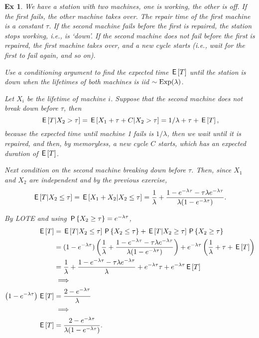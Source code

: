 \documentclass[a4paper,11pt]{article}
\newtheorem{exercise}[theorem]{Ex}
\begin{document}
\begin{exercise}
We have a station with two machines, one is working, the other is off.
If the first fails, the other machine takes over.
The repair time of the first machine is a constant $\tau$.
If the second machine fails before the first is repaired, the station stops working, i.e., is `down'. If the second machine does not fail before the first is repaired, the first machine takes over, and a new cycle starts (i.e., wait for the first to fail again, and so on).

Use a conditioning argument to find the expected time $\E T$ until the station is down when the lifetimes of both machines is iid $\sim\Exp{\lambda}$.
\begin{solution}
Let $X_i$ be the lifetime of machine $i$. Suppose that  the second machine does not break down before $\tau$, then
\begin{equation}
\E{T| X_{2}>\tau} = \E{X_{1} + \tau + C |X_2>\tau} = 1/\lambda + \tau + \E T,
\end{equation}
because the expected time until machine 1 fails is $1/\lambda$, then we wait until it is repaired, and then, by memoryless, a new cycle $C$ starts, which has an expected duration of $\E T$.

Next condition on the second machine breaking down before $\tau$. Then, since $X_{1}$ and $X_2$ are independent and by the previous exercise,
\begin{equation}
\E{T| X_{2}\leq \tau} = \E{X_{1} + X_{2}  |X_2\leq \tau} = \frac{1}{\lambda} + \frac{ 1- e^{-\lambda \tau}- \tau \lambda  e^{-\lambda \tau}}{\lambda(1-e^{-\lambda \tau})}.
\end{equation}

By LOTE and using $\P{X_{2}\geq \tau} = e^{-\lambda \tau}$,
\begin{align}
  \label{eq:924}
\E T
&=
\E{T| X_{2}\leq \tau} \P{X_{2}\leq \tau} + \E{T| X_{2}\geq \tau} \P{X_{2}\geq \tau} \\
&=(1-e^{-\lambda \tau})\left( \frac 1\lambda+
\frac{ 1- e^{-\lambda \tau}- \tau \lambda  e^{-\lambda \tau}}{\lambda(1-e^{-\lambda \tau})} \right)
+e^{-\lambda \tau}\left( \frac{1}{\lambda} + \tau + \E T \right) \\
&=\frac{1}{\lambda} + \frac{ 1- e^{-\lambda \tau}- \tau \lambda  e^{-\lambda \tau}}{\lambda}
+e^{-\lambda \tau} \tau + e^{-\lambda \tau}\E T \\
&\implies \\
\left( 1-e^{-\lambda \tau} \right) \E T
&=\frac{2-e^{-\lambda \tau}}{\lambda} \\
&\implies \\
\E T
&=\frac{2-e^{-\lambda \tau}}{\lambda(1-e^{-\lambda \tau})}.
\end{align}


\end{solution}
\end{exercise}
\end{document}
